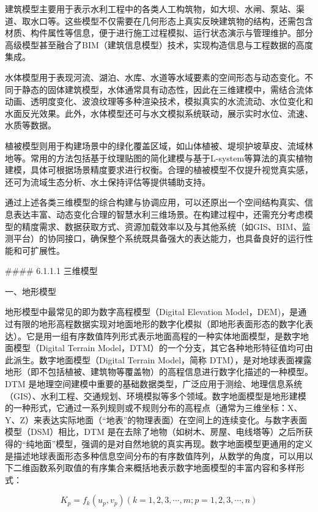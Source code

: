 建筑模型主要用于表示水利工程中的各类人工构筑物，如大坝、水闸、泵站、渠道、取水口等。这些模型不仅需要在几何形态上真实反映建筑物的结构，还需包含材质、构件属性等信息，便于进行施工过程模拟、运行状态演示与管理维护。部分高级模型甚至融合了BIM（建筑信息模型）技术，实现构造信息与工程数据的高度集成。

水体模型用于表现河流、湖泊、水库、水道等水域要素的空间形态与动态变化。不同于静态的固体建筑模型，水体通常具有动态性，因此在三维建模中，需结合流体动画、透明度变化、波浪纹理等多种渲染技术，模拟真实的水流流动、水位变化和水面反光效果。此外，水体模型还可与水文模拟系统联动，展示实时水位、流速、水质等数据。

植被模型则用于构建场景中的绿化覆盖区域，如山体植被、堤坝护坡草皮、流域林地等。常用的方法包括基于纹理贴图的简化建模与基于L-system等算法的真实植物建模，具体可根据场景精度要求进行权衡。合理的植被模型不仅提升视觉真实感，还可为流域生态分析、水土保持评估等提供辅助支持。

通过上述各类三维模型的综合构建与协调应用，可以还原出一个空间结构真实、信息表达丰富、动态变化合理的智慧水利三维场景。在构建过程中，还需充分考虑模型的精度需求、数据获取方式、资源加载效率以及与其他系统（如GIS、BIM、监测平台）的协同接口，确保整个系统既具备强大的表达能力，也具备良好的运行性能和可扩展性。

\#\#\#\# 6.1.1.1 三维模型

一、地形模型

地形模型中最常见的即为数字高程模型（Digital Elevation Model，DEM)，是通过有限的地形高程数据实现对地面地形的数字化模拟（即地形表面形态的数字化表达）。它是用一组有序数值阵列形式表示地面高程的一种实体地面模型，是数字地面模型（Digital Terrain Model，DTM）的一个分支，其它各种地形特征值均可由此派生。数字地面模型（Digital Terrain Model，简称 DTM），是对地球表面裸露地形（即不包括植被、建筑物等覆盖物）的高程信息进行数字化描述的一种模型。DTM 是地理空间建模中重要的基础数据类型，广泛应用于测绘、地理信息系统（GIS）、水利工程、交通规划、环境模拟等多个领域。数字地面模型是地形建模的一种形式，它通过一系列规则或不规则分布的高程点（通常为三维坐标：X、Y、Z）来表达实际地面（``地表''的物理表面）在空间上的连续变化。与数字表面模型（DSM）相比，DTM 是在去除了地物（如树木、房屋、电线塔等）之后所获得的``纯地面''模型，强调的是对自然地貌的真实再现。数字地面模型更通用的定义是描述地球表面形态多种信息空间分布的有序数值阵列，从数学的角度，可以用以下二维函数系列取值的有序集合来概括地表示数字地面模型的丰富内容和多样形式：

\begin{equation}
K_p = f_k(u_p,v_p)(k=1,2,3,\cdots,m;p=1,2,3,\cdots,n)
\end{equation}

